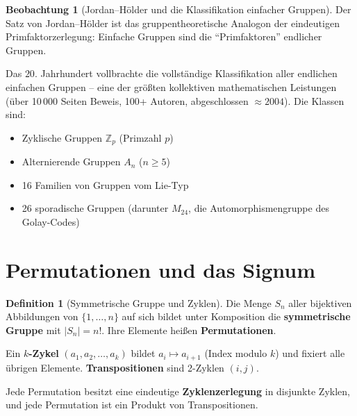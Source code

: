 ﻿\documentclass[a4paper,12pt]{report}
\theoremstyle{definition}
\newtheorem{definition}{Definition}
\newtheorem{beobachtung}{Beobachtung}
\begin{document}
\begin{beobachtung}[Jordan--Hölder und die Klassifikation einfacher Gruppen]
    Der Satz von Jordan--Hölder ist das gruppentheoretische Analogon
    der eindeutigen Primfaktorzerlegung: Einfache Gruppen sind die
    ``Primfaktoren'' endlicher Gruppen.

    Das $20.$ Jahrhundert vollbrachte die vollständige Klassifikation
    aller endlichen einfachen Gruppen -- eine der größten kollektiven
    mathematischen Leistungen (über 10\,000 Seiten Beweis, 100+ Autoren,
    abgeschlossen $\approx 2004$). Die Klassen sind:
    \begin{itemize}
        \item[-] Zyklische Gruppen $\mathbb{Z}_p$ (Primzahl $p$)
        \item[-] Alternierende Gruppen $A_n$ ($n \geq 5$)
        \item[-] 16 Familien von Gruppen vom Lie-Typ
        \item[-] 26 sporadische Gruppen (darunter $M_{24}$, die Automorphismengruppe
              des Golay-Codes)
    \end{itemize}
\end{beobachtung}

\section{Permutationen und das Signum}

\begin{definition}[Symmetrische Gruppe und Zyklen]
    Die Menge $S_n$ aller bijektiven Abbildungen von $\{1, \dots, n\}$
    auf sich bildet unter Komposition die \textbf{symmetrische Gruppe}
    mit $|S_n| = n!$. Ihre Elemente heißen \textbf{Permutationen}.

    Ein \textbf{$k$-Zykel} $(a_1, a_2, \dots, a_k)$ bildet $a_i \mapsto a_{i+1}$
    (Index modulo $k$) und fixiert alle übrigen Elemente.
    \textbf{Transpositionen} sind 2-Zyklen $(i,j)$.

    Jede Permutation besitzt eine eindeutige \textbf{Zyklenzerlegung}
    in disjunkte Zyklen, und jede Permutation ist ein Produkt von
    Transpositionen.
\end{definition}
\end{document}
